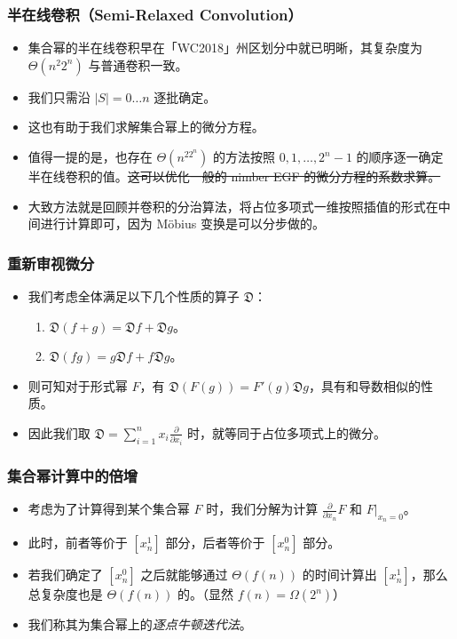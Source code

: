\documentclass[mathserif]{ctexbeamer}
\begin{document}
\frame
{
  \frametitle{半在线卷积（Semi-Relaxed Convolution）}
  
  \begin{itemize}
  \item<1-> 集合幂的半在线卷积早在「WC2018」州区划分中就已明晰，其复杂度为 $\Theta(n^2 2^n)$ 与普通卷积一致。
  \item<2-> 我们只需沿 $|S| = 0 \dots n$ 逐批确定。
  \item<3-> 这也有助于我们求解集合幂上的微分方程。
  \end{itemize}
}

\frame
{
  \begin{itemize}
  \item<1-> 值得一提的是，也存在 $\Theta(n^22^n)$ 的方法按照 $0,1,\dots,2^n-1$ 的顺序逐一确定半在线卷积的值。\sout{这可以优化一般的 nimber EGF 的微分方程的系数求算。}
  \item<2-> 大致方法就是回顾并卷积的分治算法，将占位多项式一维按照插值的形式在中间进行计算即可，因为 M\"obius 变换是可以分步做的。
  \end{itemize}
}

\frame
{
  \frametitle{重新审视微分}
  
  \begin{itemize}
  \item<1-> 我们考虑全体满足以下几个性质的算子 $\mathfrak D$：
    \begin{enumerate}
    \item<2-> $\mathfrak D (f + g) = \mathfrak D f + \mathfrak D g$。
    \item<3-> $\mathfrak D (fg) = g\mathfrak D f + f\mathfrak D g$。
    \end{enumerate}
  \item<4-> 则可知对于形式幂 $F$，有 $\mathfrak D (F(g)) = F'(g) \mathfrak D g$，具有和导数相似的性质。
  \item<5-> 因此我们取 $\mathfrak D = \sum_{i=1}^n x_i\frac{\partial}{\partial x_i}$ 时，就等同于占位多项式上的微分。
  \end{itemize}
}

\frame
{
  \frametitle{集合幂计算中的倍增}
  
  \begin{itemize}
  \item<1-> 考虑为了计算得到某个集合幂 $F$ 时，我们分解为计算 $\frac{\partial}{\partial x_n} F$ 和 $\left . F \right |_{x_n=0}$。
  \item<2-> 此时，前者等价于 $[x_n^1]$ 部分，后者等价于 $[x_n^0]$ 部分。
  \item<3-> 若我们确定了 $[x_n^0]$ 之后就能够通过 $\Theta(f(n))$ 的时间计算出 $[x_n^1]$，那么总复杂度也是 $\Theta(f(n))$ 的。（显然 $f(n) = \Omega(2^n)$）
  \item<4-> 我们称其为集合幂上的\emph{逐点牛顿迭代法}。
  \end{itemize}
}
\end{document}
